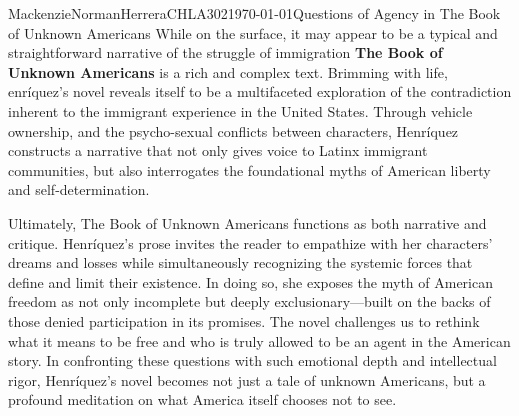 \documentclass{article}
\begin{document}
\begin{mla}{Mackenzie}{Norman}{Herrera}{CHLA302}{\today}{Questions of Agency in The Book of Unknown Americans}
While on the surface, it may appear to be a typical and straightforward narrative of the struggle of immigration  \textbf{The Book of Unknown Americans }is a rich and complex text. Brimming with life, enríquez’s novel reveals itself to be a multifaceted exploration of the contradiction inherent to the immigrant experience in the United States. Through vehicle ownership, and the psycho-sexual conflicts between characters, Henríquez constructs a narrative that not only gives voice to Latinx immigrant communities, but also interrogates the foundational myths of American liberty and self-determination.  

Ultimately, The Book of Unknown Americans functions as both narrative and critique. Henríquez’s prose invites the reader to empathize with her characters’ dreams and losses while simultaneously recognizing the systemic forces that define and limit their existence. In doing so, she exposes the myth of American freedom as not only incomplete but deeply exclusionary—built on the backs of those denied participation in its promises. The novel challenges us to rethink what it means to be free and who is truly allowed to be an agent in the American story. In confronting these questions with such emotional depth and intellectual rigor, Henríquez’s novel becomes not just a tale of unknown Americans, but a profound meditation on what America itself chooses not to see.



\printbibliography

\end{mla}
\end{document}
